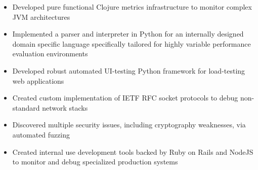 \documentclass[10pt,a4paper]{altacv}
\newenvironment{tightitemize} %
{\vspace{-\topsep}\begin{itemize}\itemsep1pt \parskip0pt \parsep0pt}
{\end{itemize}\vspace{-\topsep}}
\begin{document}
\smallskip
\divider
\smallskip

\vspace{\topsep} %
\begin{tightitemize}
    \item Developed pure functional Clojure metrics infrastructure to monitor 
        complex JVM architectures
    \item Implemented a parser and interpreter in Python for an 
        internally designed domain specific language specifically tailored for 
        highly variable performance evaluation environments
\end{tightitemize}

\smallskip
\divider
\smallskip

\vspace{\topsep} %
\begin{tightitemize}
    \item Developed robust automated UI-testing Python framework for 
        load-testing web applications
    \item Created custom implementation of IETF RFC socket protocols to debug 
        non-standard network stacks
    \item Discovered multiple security issues, including cryptography 
        weaknesses, via automated fuzzing
\end{tightitemize}

\smallskip
\divider
\smallskip

\vspace{\topsep} %
\begin{tightitemize}
\item Created internal use development tools backed by Ruby on Rails 
    and NodeJS to monitor and debug specialized production 
    systems
\end{tightitemize}
\end{document}
